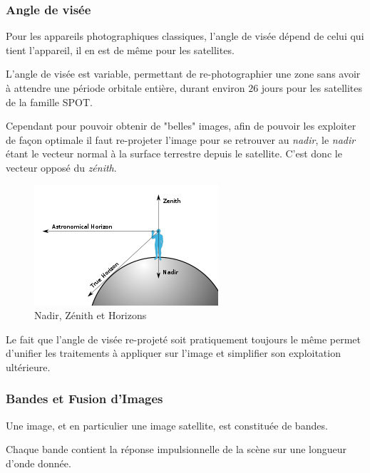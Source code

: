 \documentclass[a4paper, 11pt]{report}
\begin{document}
\subsubsection{Angle de visée}
Pour les appareils photographiques classiques, l'angle de visée dépend de celui qui tient l'appareil, il en est de même pour les satellites. 

L'angle de visée est variable, permettant de re-photographier une zone sans avoir à attendre une période orbitale entière, durant environ $26$ jours pour les satellites de la famille SPOT.

Cependant pour pouvoir obtenir de "belles" images, afin de pouvoir les exploiter de façon optimale il faut re-projeter l'image pour se retrouver au \emph{nadir}, le \emph{nadir} étant le vecteur normal à la surface terrestre depuis le satellite. C'est donc le vecteur opposé du \emph{zénith}.
\begin{figure}[H]
	\centering
	\includegraphics[scale=0.9]{Images/Nadir.png}
	\caption{Nadir, Zénith et Horizons \citep{Wikipedia2017a}}
\end{figure}

Le fait que l'angle de visée re-projeté soit pratiquement toujours le même permet d'unifier les traitements à appliquer sur l'image et simplifier son exploitation ultérieure.
\subsubsection{Bandes et Fusion d'Images}
Une image, et en particulier une image satellite, est constituée de bandes. 

Chaque bande contient la réponse impulsionnelle de la scène sur une longueur d'onde donnée.
\end{document}
